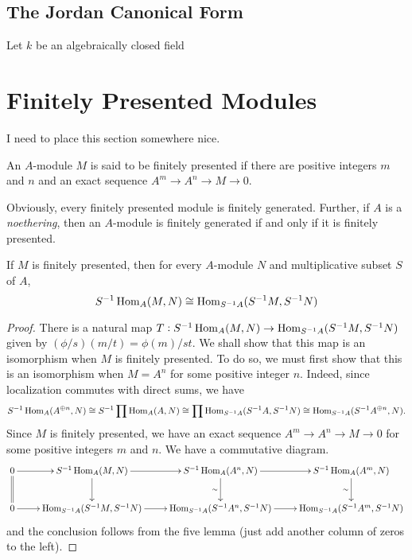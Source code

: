 \subsection{The Jordan Canonical Form}

Let $k$ be an algebraically closed field 

\section{Finitely Presented Modules}

I need to place this section somewhere nice.

\begin{definition}
    An $A$-module $M$ is said to be finitely presented if there are positive integers $m$ and $n$ and an exact sequence $A^m\rightarrow A^n\rightarrow M\rightarrow 0$.
\end{definition}

Obviously, every finitely presented module is finitely generated. Further, if $A$ is a \textit{noethering}, then an $A$-module is finitely generated if and only if it is finitely presented.

\begin{proposition}
    If $M$ is finitely presented, then for every $A$-module $N$ and multiplicative subset $S$ of $A$, 
    \begin{equation*}
        S^{-1}\operatorname{Hom}_A(M,N)\cong\operatorname{Hom}_{S^{-1}A}(S^{-1}M,S^{-1}N)
    \end{equation*}
\end{proposition}
\begin{proof}
    There is a natural map $T:S^{-1}\operatorname{Hom}_A(M,N)\to\operatorname{Hom}_{S^{-1}A}(S^{-1}M,S^{-1}N)$ given by $(\phi/s)(m/t) = \phi(m)/st$. We shall show that this map is an isomorphism when $M$ is finitely presented. To do so, we must first show that this is an isomorphism when $M = A^n$ for some positive integer $n$. Indeed, since localization commutes with direct sums, we have 
    \begin{equation*}
        S^{-1}\operatorname{Hom}_A(A^{\oplus n}, N)\cong S^{-1}\prod\operatorname{Hom}_A(A,N)\cong\prod\operatorname{Hom}_{S^{-1}A}(S^{-1}A, S^{-1}N)\cong\operatorname{Hom}_{S^{-1}A}(S^{-1}A^{\oplus n}, N).
    \end{equation*}
    Since $M$ is finitely presented, we have an exact sequence $A^m\rightarrow A^n\rightarrow M\rightarrow 0$ for some positive integers $m$ and $n$. We have a commutative diagram. 
    \begin{equation*}
        \xymatrix{
            0\ar[r]\ar@{=}[d] & S^{-1}\Hom_A(M,N)\ar[r]\ar[d] & S^{-1}\Hom_A(A^n, N)\ar[r]\ar[d]_\sim & S^{-1}\Hom_A(A^m,N)\ar[d]_\sim\\
            0\ar[r] & \Hom_{S^{-1}A}(S^{-1}M,S^{-1}N)\ar[r] & \Hom_{S^{-1}A}(S^{-1}A^n, S^{-1}N)\ar[r] & \Hom_{S^{-1}A}(S^{-1}A^m,S^{-1}N)\\
        }
    \end{equation*}
    and the conclusion follows from the five lemma (just add another column of zeros to the left).
\end{proof}

